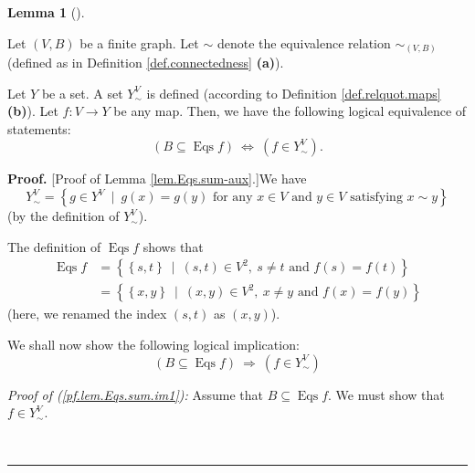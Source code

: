 \documentclass[numbers=enddot,12pt,final,onecolumn,notitlepage]{scrartcl}%
\theoremstyle{definition}
\newtheorem{lem}[theo]{Lemma}
\newenvironment{lemma}[1][]
{\begin{lem}[#1]\begin{leftbar}}
{\end{leftbar}\end{lem}}
\newenvironment{proof}[1][Proof]{\noindent\textbf{#1.} }{\ \rule{0.5em}{0.5em}}
\newenvironment{verlong}{}{}
\begin{document}
\begin{verlong}
\begin{lemma}
\label{lem.Eqs.sum-aux}Let $\left(  V,B\right)  $ be a finite graph. Let
$\sim$ denote the equivalence relation $\sim_{\left(  V,B\right)  }$ (defined
as in Definition \ref{def.connectedness} \textbf{(a)}).

Let $Y$ be a set. A set $Y_{\sim}^{V}$ is defined (according to Definition
\ref{def.relquot.maps} \textbf{(b)}). Let $f:V\rightarrow Y$ be any map. Then,
we have the following logical equivalence of statements:%
\[
\left(  B\subseteq\operatorname*{Eqs}f\right)  \ \Longleftrightarrow\ \left(
f\in Y_{\sim}^{V}\right)  .
\]

\end{lemma}

\begin{proof}
[Proof of Lemma \ref{lem.Eqs.sum-aux}.]We have%
\begin{equation}
Y_{\sim}^{V}=\left\{  g\in Y^{V}\ \mid\ g\left(  x\right)  =g\left(  y\right)
\text{ for any }x\in V\text{ and }y\in V\text{ satisfying }x\sim y\right\}
\label{pf.lem.Eqs.sum.defN+Vsim}%
\end{equation}
(by the definition of $Y_{\sim}^{V}$).

The definition of $\operatorname*{Eqs}f$ shows that%
\begin{align}
\operatorname*{Eqs}f  &  =\left\{  \left\{  s,t\right\}  \ \mid\ \left(
s,t\right)  \in V^{2},\ s\neq t\text{ and }f\left(  s\right)  =f\left(
t\right)  \right\} \nonumber\\
&  =\left\{  \left\{  x,y\right\}  \ \mid\ \left(  x,y\right)  \in
V^{2},\ x\neq y\text{ and }f\left(  x\right)  =f\left(  y\right)  \right\}
\label{pf.lem.Eqs.sum.defEqs}%
\end{align}
(here, we renamed the index $\left(  s,t\right)  $ as $\left(  x,y\right)  $).

We shall now show the following logical implication:%
\begin{equation}
\left(  B\subseteq\operatorname*{Eqs}f\right)  \ \Longrightarrow\ \left(  f\in
Y_{\sim}^{V}\right)  \label{pf.lem.Eqs.sum.im1}%
\end{equation}


\textit{Proof of (\ref{pf.lem.Eqs.sum.im1}):} Assume that $B\subseteq
\operatorname*{Eqs}f$. We must show that $f\in Y_{\sim}^{V}$.


\end{proof}
\end{verlong}
\end{document}

